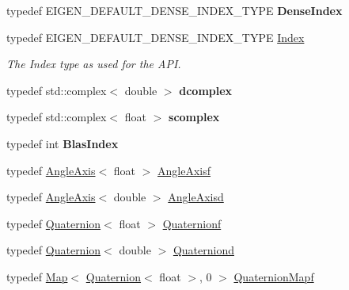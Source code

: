\begin{DoxyCompactItemize}
\item 
\mbox{\label{namespace_eigen_aa06499c94936a19673e53deb516a1b76}} 
typedef E\+I\+G\+E\+N\+\_\+\+D\+E\+F\+A\+U\+L\+T\+\_\+\+D\+E\+N\+S\+E\+\_\+\+I\+N\+D\+E\+X\+\_\+\+T\+Y\+PE {\bfseries Dense\+Index}
\item 
typedef E\+I\+G\+E\+N\+\_\+\+D\+E\+F\+A\+U\+L\+T\+\_\+\+D\+E\+N\+S\+E\+\_\+\+I\+N\+D\+E\+X\+\_\+\+T\+Y\+PE \hyperlink{namespace_eigen_a62e77e0933482dafde8fe197d9a2cfde}{Index}
\begin{DoxyCompactList}\small\item\em The Index type as used for the A\+PI. \end{DoxyCompactList}\item 
\mbox{\label{namespace_eigen_a98d4a3e6a17265ea869019a892c18348}} 
typedef std\+::complex$<$ double $>$ {\bfseries dcomplex}
\item 
\mbox{\label{namespace_eigen_a04a60bbffdc89e47eb1ff3adc31fd559}} 
typedef std\+::complex$<$ float $>$ {\bfseries scomplex}
\item 
\mbox{\label{namespace_eigen_a02236777748981f69ac8703769d03088}} 
typedef int {\bfseries Blas\+Index}
\item 
typedef \hyperlink{group___geometry___module_class_eigen_1_1_angle_axis}{Angle\+Axis}$<$ float $>$ \hyperlink{group___geometry___module_gadc7128416da41ca99bb8af814b78599e}{Angle\+Axisf}
\item 
typedef \hyperlink{group___geometry___module_class_eigen_1_1_angle_axis}{Angle\+Axis}$<$ double $>$ \hyperlink{group___geometry___module_gac218cd8f23b49aa36401d0c843bb6835}{Angle\+Axisd}
\item 
typedef \hyperlink{group___geometry___module_class_eigen_1_1_quaternion}{Quaternion}$<$ float $>$ \hyperlink{group___geometry___module_ga785b13a5a87f9bf55d4eba51ead2dcf0}{Quaternionf}
\item 
typedef \hyperlink{group___geometry___module_class_eigen_1_1_quaternion}{Quaternion}$<$ double $>$ \hyperlink{group___geometry___module_ga6e77eb8b6aae0e04be2db88107dbc642}{Quaterniond}
\item 
typedef \hyperlink{group___core___module_class_eigen_1_1_map}{Map}$<$ \hyperlink{group___geometry___module_class_eigen_1_1_quaternion}{Quaternion}$<$ float $>$, 0 $>$ \hyperlink{group___geometry___module_ga7dad770768dc28ad3cee4696841a5dd4}{Quaternion\+Mapf}

\end{DoxyCompactItemize}
